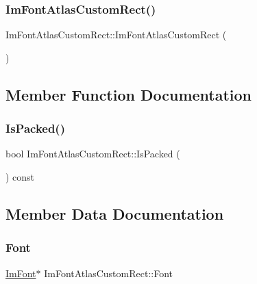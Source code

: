 \subsubsection{\texorpdfstring{Im\+Font\+Atlas\+Custom\+Rect()}{ImFontAtlasCustomRect()}}
{\footnotesize\ttfamily Im\+Font\+Atlas\+Custom\+Rect\+::\+Im\+Font\+Atlas\+Custom\+Rect (\begin{DoxyParamCaption}{ }\end{DoxyParamCaption})\hspace{0.3cm}{\ttfamily [inline]}}



\subsection{Member Function Documentation}
\mbox{\label{structImFontAtlasCustomRect_a8829c3c64981078ba03d75c2b07e2abc}} 
\subsubsection{\texorpdfstring{Is\+Packed()}{IsPacked()}}
{\footnotesize\ttfamily bool Im\+Font\+Atlas\+Custom\+Rect\+::\+Is\+Packed (\begin{DoxyParamCaption}{ }\end{DoxyParamCaption}) const\hspace{0.3cm}{\ttfamily [inline]}}



\subsection{Member Data Documentation}
\mbox{\label{structImFontAtlasCustomRect_ae0b05bcab100beb72c96c4a606c61b3a}} 
\subsubsection{\texorpdfstring{Font}{Font}}
{\footnotesize\ttfamily \hyperlink{structImFont}{Im\+Font}$\ast$ Im\+Font\+Atlas\+Custom\+Rect\+::\+Font}

